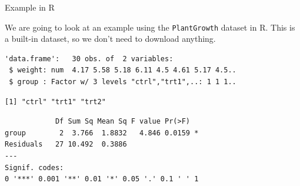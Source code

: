 \begin{frame}{Example in R}

We are going to look at an example using the \texttt{PlantGrowth} dataset in R.
This is a built-in dataset, so we don't need to download anything.

\begin{knitrout}\small
{}\color{fgcolor}\begin{kframe}
\begin{alltt}
  
\end{alltt}
\begin{verbatim}
'data.frame':	30 obs. of  2 variables:
 $ weight: num  4.17 5.58 5.18 6.11 4.5 4.61 5.17 4.5..
 $ group : Factor w/ 3 levels "ctrl","trt1",..: 1 1 1..
\end{verbatim}
\begin{alltt}
\hlopt{$}
\end{alltt}
\begin{verbatim}
[1] "ctrl" "trt1" "trt2"
\end{verbatim}
\end{kframe}
\end{knitrout}

\framebreak

\begin{knitrout}\small
{}\color{fgcolor}\begin{kframe}
\begin{alltt}
 \hlkwb{<-}  \hlopt{~}   
\end{alltt}
\begin{verbatim}
            Df Sum Sq Mean Sq F value Pr(>F)  
group        2  3.766  1.8832   4.846 0.0159 *
Residuals   27 10.492  0.3886                 
---
Signif. codes:  
0 '***' 0.001 '**' 0.01 '*' 0.05 '.' 0.1 ' ' 1
\end{verbatim}
\end{kframe}
\end{knitrout}



\end{frame}

